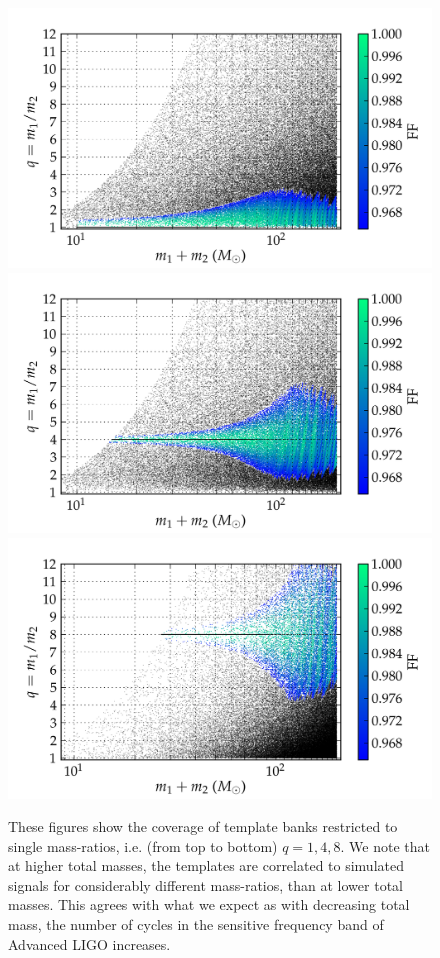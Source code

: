 \begin{figure}
\begin{center}
\includegraphics[width=0.7\columnwidth]{figures/nrhybbank/bank_separate_q1_mtot200_match-tiny.png}
\includegraphics[width=0.7\columnwidth]{figures/nrhybbank/bank_separate_q4_mtot200_match-tiny.png}
\includegraphics[width=0.7\columnwidth]{figures/nrhybbank/bank_separate_q8_mtot200_match-tiny.png}
\caption{\label{fig:separate_q148} These figures show the coverage of template
  banks restricted to single mass-ratios, i.e. (from top to bottom) 
  $q = 1, 4, 8$. We note that at 
  higher total masses, the templates are correlated to simulated signals for
  considerably different mass-ratios, than at lower total masses. This agrees
  with what we expect as with decreasing total mass, the number of cycles in
  the sensitive frequency band of Advanced LIGO increases.} 
\end{center}
\end{figure}

